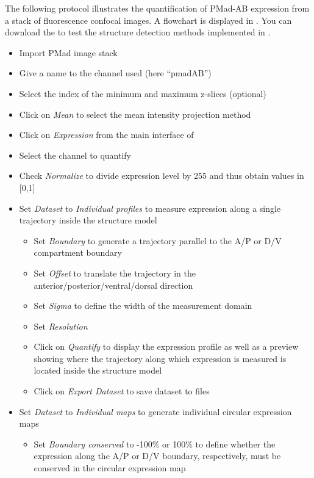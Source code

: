 The following protocol illustrates the quantification of PMad-AB expression from a stack of fluorescence confocal images. A flowchart is displayed in . You can download the \wingjBenchmarkImages to test the structure detection methods implemented in \wingj.

\begin{itemize}
 \item Import PMad image stack 
 \item Give a name to the channel used (here ``pmadAB'')
 \item Select the index of the minimum and maximum z-slices (optional)
 \item Click on \textit{Mean} to select the mean intensity projection method
 \item Click on \textit{Expression} from the main interface of \wingj
 \item Select the channel to quantify
 \item Check \textit{Normalize} to divide expression level by 255 and thus obtain values in [0,1]
 \item Set \emph{Dataset} to \textit{Individual profiles} to measure expression along a single trajectory inside the structure model
  \begin{itemize}
      \item Set \textit{Boundary} to generate a trajectory parallel to the A/P or D/V compartment boundary
      \item Set \textit{Offset} to translate the trajectory in the anterior/posterior/ventral/dorsal direction
      \item Set \textit{Sigma} to define the width of the measurement domain
      \item Set \textit{Resolution}
      \item Click on \textit{Quantify} to display the expression profile as well as a preview showing where the trajectory along which expression is measured is located inside the structure model
      \item Click on \textit{Export Dataset} to save dataset to files
   \end{itemize}
  \item Set \emph{Dataset} to \textit{Individual maps} to generate individual circular expression maps
      \begin{itemize}
      \item Set \textit{Boundary conserved} to -100\% or 100\% to define whether the expression along the A/P or D/V boundary, respectively, must be conserved in the circular expression map

\end{itemize}
\end{itemize}
